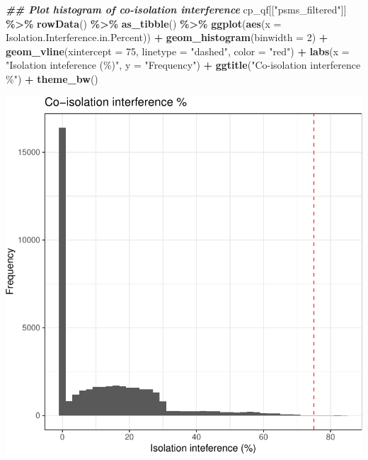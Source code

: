 \documentclass[9pt,a4paper,]{extarticle}
\newenvironment{Shaded}{\begin{snugshade}}{\end{snugshade}}
\newcommand{\AttributeTok}[1]{\textcolor[rgb]{0.13,0.29,0.53}{#1}}
\newcommand{\DecValTok}[1]{\textcolor[rgb]{0.00,0.00,0.81}{#1}}
\newcommand{\DocumentationTok}[1]{\textcolor[rgb]{0.56,0.35,0.01}{\textbf{\textit{#1}}}}
\newcommand{\FunctionTok}[1]{\textcolor[rgb]{0.13,0.29,0.53}{\textbf{#1}}}
\newcommand{\NormalTok}[1]{#1}
\newcommand{\SpecialCharTok}[1]{\textcolor[rgb]{0.81,0.36,0.00}{\textbf{#1}}}
\newcommand{\StringTok}[1]{\textcolor[rgb]{0.31,0.60,0.02}{#1}}
\begin{document}
\begin{Shaded}
\begin{Highlighting}[]
\DocumentationTok{\#\# Plot histogram of co{-}isolation interference}
\NormalTok{cp\_qf[[}\StringTok{"psms\_filtered"}\NormalTok{]] }\SpecialCharTok{\%\textgreater{}\%}
  \FunctionTok{rowData}\NormalTok{() }\SpecialCharTok{\%\textgreater{}\%}
  \FunctionTok{as\_tibble}\NormalTok{() }\SpecialCharTok{\%\textgreater{}\%}
  \FunctionTok{ggplot}\NormalTok{(}\FunctionTok{aes}\NormalTok{(}\AttributeTok{x =}\NormalTok{ Isolation.Interference.in.Percent)) }\SpecialCharTok{+}
  \FunctionTok{geom\_histogram}\NormalTok{(}\AttributeTok{binwidth =} \DecValTok{2}\NormalTok{) }\SpecialCharTok{+}
  \FunctionTok{geom\_vline}\NormalTok{(}\AttributeTok{xintercept =} \DecValTok{75}\NormalTok{, }\AttributeTok{linetype =} \StringTok{"dashed"}\NormalTok{, }\AttributeTok{color =} \StringTok{"red"}\NormalTok{) }\SpecialCharTok{+}
  \FunctionTok{labs}\NormalTok{(}\AttributeTok{x =} \StringTok{"Isolation inteference (\%)"}\NormalTok{, }\AttributeTok{y =} \StringTok{"Frequency"}\NormalTok{) }\SpecialCharTok{+}
  \FunctionTok{ggtitle}\NormalTok{(}\StringTok{"Co{-}isolation interference \%"}\NormalTok{) }\SpecialCharTok{+}
  \FunctionTok{theme\_bw}\NormalTok{()}
\end{Highlighting}
\end{Shaded}

\begin{center}\includegraphics[height=0.3\textheight]{workflow_expressions_files/figure-latex/tmt_coisolation_2-1} \end{center}
\end{document}
